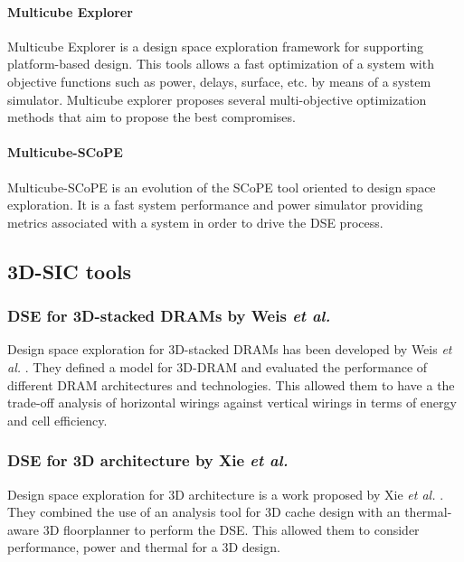 \paragraph{Multicube Explorer}

Multicube Explorer \cite{m3explorer09} is a design space exploration framework for supporting platform-based design. This tools allows a fast optimization of a system with objective functions such as power, delays, surface, etc. by means of a system simulator. Multicube explorer proposes several multi-objective optimization methods that aim to propose the best compromises.

\paragraph{Multicube-SCoPE}

Multicube-SCoPE \cite{m3scope09} is an evolution of the SCoPE tool \cite{scope04} oriented to design space exploration. It is a fast system performance and power simulator providing metrics associated with a system in order to drive the DSE process.

\subsection{3D-SIC tools}

\subsubsection{DSE for 3D-stacked DRAMs by Weis \textit{et al.}}
Design space exploration for 3D-stacked DRAMs has been developed by Weis \textit{et al.} \cite{5763068}. They defined a model for 3D-DRAM and evaluated the performance of different DRAM architectures and technologies. This allowed them to have a the trade-off analysis of horizontal wirings against vertical wirings in terms of energy and cell efficiency.

\subsubsection{DSE for 3D architecture by Xie \textit{et al.}}
Design space exploration for 3D architecture is a work proposed by Xie \textit{et al.} \cite{Xie:2006:DSE:1148015.1148016}. They combined the use of an analysis tool for 3D cache design with an thermal-aware 3D floorplanner to perform the DSE. This allowed them to consider performance, power and thermal for a 3D design. 

